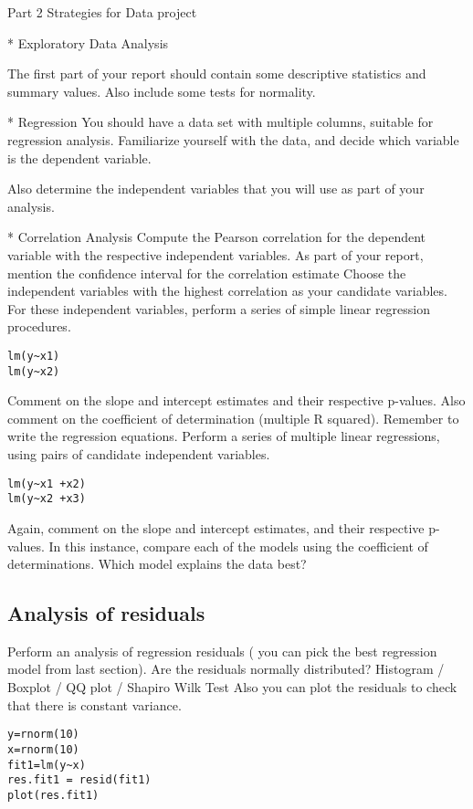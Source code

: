 Part 2 Strategies for Data project
\begin{itemize}
*  Exploratory Data Analysis

The first part of your report should contain some descriptive statistics and summary values. Also include some tests for normality.

* {Regression}
You should have a data set with multiple columns, suitable for regression analysis.
Familiarize yourself with the data, and decide which variable is the dependent variable.

Also determine the independent variables that you will use as part of your analysis.

* {Correlation Analysis}
Compute the Pearson correlation for the dependent variable with the respective independent variables.  As part of your report, mention the confidence interval for the correlation estimate
Choose the independent variables with the highest correlation as your candidate variables.
For these independent variables, perform a series of simple linear regression procedures.
\begin{verbatim}
lm(y~x1)
lm(y~x2)
\end{verbatim}
Comment on the slope and intercept estimates and their respective p-values. Also comment on the coefficient of determination (multiple R squared). Remember to write the regression equations.
Perform a series of multiple linear regressions, using pairs of candidate independent variables.
\begin{verbatim}
lm(y~x1 +x2)
lm(y~x2 +x3)
\end{verbatim}
Again, comment on the slope and intercept estimates, and their respective p-values.
In this instance, compare each of the models using the coefficient of determinations. Which model explains the data best?
\subsection{Analysis of residuals}
Perform an analysis of regression residuals ( you can pick the best regression model from last section).
Are the residuals normally distributed?
Histogram /  Boxplot / QQ plot / Shapiro Wilk Test
Also you can plot the residuals to check that there is constant variance.
\begin{verbatim}
y=rnorm(10)
x=rnorm(10)
fit1=lm(y~x)
res.fit1 = resid(fit1)
plot(res.fit1)
\end{verbatim}




\newpage

\end{itemize}
